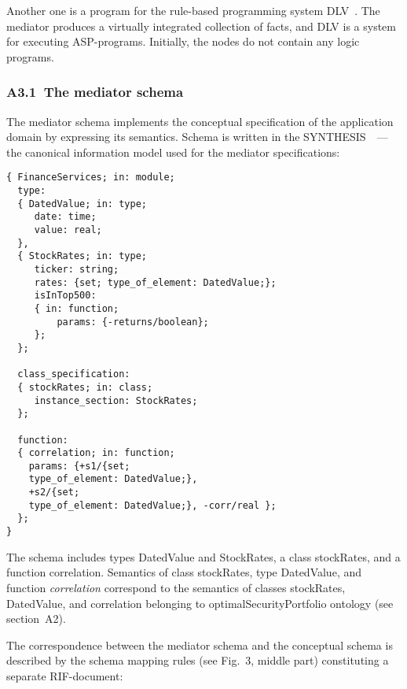 \begin{multicols}{2}
{Another one is a program for the rule-based
programming system DLV~\cite{9-kal}. The mediator produces a virtually integrated
collection of facts, and DLV is a system for executing ASP-programs. Initially, the
nodes do not contain any logic programs.

\subsubsection*{A3.1\ The mediator schema}

  \noindent
  The mediator schema implements the conceptual specification of the application
domain by expressing its semantics. Schema is written in the
  SYNTHESIS~\cite{4-kal}~--- the canonical information model used for the
mediator specifications:
}


{\small
  \begin{verbatim}
{ FinanceServices; in: module;
  type:
  { DatedValue; in: type;
     date: time;
     value: real;
  },
  { StockRates; in: type;
     ticker: string;
     rates: {set; type_of_element: DatedValue;};
     isInTop500:
     { in: function;
         params: {-returns/boolean};
     };
  };

  class_specification:
  { stockRates; in: class;
     instance_section: StockRates;
  };

  function:
  { correlation; in: function;
    params: {+s1/{set; 
    type_of_element: DatedValue;},
    +s2/{set; 
    type_of_element: DatedValue;}, -corr/real };
  };
}
  \end{verbatim}
  
  \vspace*{-18pt}
  


  The schema includes types {\sf DatedValue} and {\sf StockRates}, a class {\sf
stockRates}, and a function {\sf correlation}. Semantics of class {\sf stockRates},
type {\sf DatedValue}, and function \textit{correlation} correspond to the semantics of
classes {\sf stockRates}, {\sf DatedValue}, and {\sf correlation} belonging to {\sf
optimalSecurityPortfolio} ontology (see section~A2).

  The correspondence between the mediator schema and the conceptual schema is
described by the schema mapping rules (see Fig.~3, middle part) constituting a separate
RIF-document:
}

\end{multicols}

